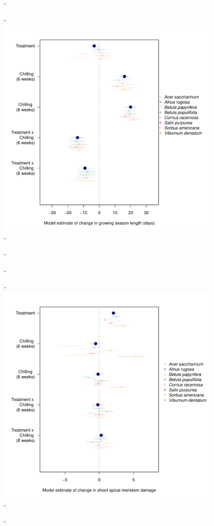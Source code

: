 \documentclass{article}\usepackage[]{graphicx}\usepackage[]{color}
\begin{document}
  {\begin{figure} [H]
  -\begin{center}
  -\includegraphics[width=16cm]{..//analyses/figures/gslengthlo_brms.pdf} %
  -\end{center}
  -\end{figure}}
  
  {\begin{figure} [H]
  -\begin{center}
  -\includegraphics[width=16cm]{..//analyses/figures/meristem_brms.pdf} %
  -\end{center}
  -\end{figure}}
  
\end{document}
